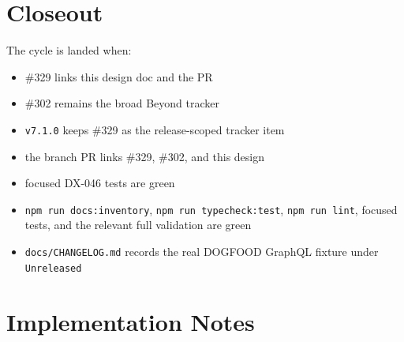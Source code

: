 \section{Closeout}\label{record-142-closeout}

The cycle is landed when:

\begin{itemize}
\tightlist
\item
  \#329 links this design doc and the PR
\item
  \#302 remains the broad Beyond tracker
\item
  \texttt{v\allowbreak{}7\allowbreak{}.\allowbreak{}1\allowbreak{}.\allowbreak{}0} keeps \#329 as the release-scoped tracker item
\item
  the branch PR links \#329, \#302, and this design
\item
  focused DX-046 tests are green
\item
  \texttt{n\allowbreak{}p\allowbreak{}m\allowbreak{} \allowbreak{}r\allowbreak{}u\allowbreak{}n\allowbreak{} \allowbreak{}d\allowbreak{}o\allowbreak{}c\allowbreak{}s\allowbreak{}:\allowbreak{}i\allowbreak{}n\allowbreak{}v\allowbreak{}e\allowbreak{}n\allowbreak{}t\allowbreak{}o\allowbreak{}r\allowbreak{}y}, \texttt{n\allowbreak{}p\allowbreak{}m\allowbreak{} \allowbreak{}r\allowbreak{}u\allowbreak{}n\allowbreak{} \allowbreak{}t\allowbreak{}y\allowbreak{}p\allowbreak{}e\allowbreak{}c\allowbreak{}h\allowbreak{}e\allowbreak{}c\allowbreak{}k\allowbreak{}:\allowbreak{}t\allowbreak{}e\allowbreak{}s\allowbreak{}t}, \texttt{n\allowbreak{}p\allowbreak{}m\allowbreak{} \allowbreak{}r\allowbreak{}u\allowbreak{}n\allowbreak{} \allowbreak{}l\allowbreak{}i\allowbreak{}n\allowbreak{}t}, focused tests, and the relevant full validation are green
\item
  \texttt{d\allowbreak{}o\allowbreak{}c\allowbreak{}s\allowbreak{}/\allowbreak{}C\allowbreak{}H\allowbreak{}A\allowbreak{}N\allowbreak{}G\allowbreak{}E\allowbreak{}L\allowbreak{}O\allowbreak{}G\allowbreak{}.\allowbreak{}m\allowbreak{}d} records the real DOGFOOD GraphQL fixture under \texttt{U\allowbreak{}n\allowbreak{}r\allowbreak{}e\allowbreak{}l\allowbreak{}e\allowbreak{}a\allowbreak{}s\allowbreak{}e\allowbreak{}d}
\end{itemize}

\section{Implementation Notes}\label{record-142-implementation-notes}

